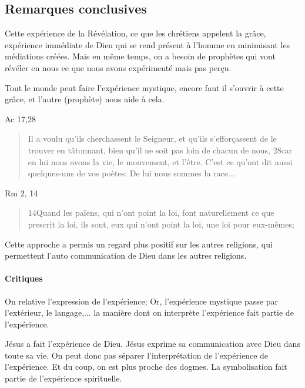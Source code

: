 \subsection{Remarques conclusives }

\begin{Synthesis}
Cette expérience de la Révélation, ce que les chrétiens appelent la grâce, expérience immédiate de Dieu qui se rend présent à l'homme en minimisant les médiations créées.
Mais en même temps, on a besoin de prophètes qui vont révéler en nous ce que nous avons expérimenté mais pas perçu.
\end{Synthesis} 

Tout le monde peut faire l'expérience mystique, encore faut il s'ouvrir à cette grâce, et l'autre (prophète) nous aide à cela.

Ac 17,28
\begin{quote}
    Il a voulu qu'ils cherchassent le Seigneur, et qu'ils s'efforçassent de le trouver en tâtonnant, bien qu'il ne soit pas loin de chacun de nous, 28car en lui nous avons la vie, le mouvement, et l'être. C'est ce qu'ont dit aussi quelques-uns de vos poètes: De lui nous sommes la race... 
\end{quote}


Rm 2, 14

\begin{quote}
    14Quand les païens, qui n'ont point la loi, font naturellement ce que prescrit la loi, ils sont, eux qui n'ont point la loi, une loi pour eux-mêmes;
\end{quote}

Cette approche a permis un regard plus positif sur les autres religions, qui permettent l'auto communication de Dieu dans les autres religions. 

\paragraph{Critiques} On relative l'expression de l'expérience; Or, l'expérience mystique passe par l'extérieur, le langage,... la manière dont on interprète l'expérience fait partie de l'expérience.

\begin{Ex}
Jésus a fait l'expérience de Dieu. Jésus exprime sa communication avec Dieu dans toute sa vie.
On peut donc pas séparer l'interprétation de l'expérience de l'expérience.
Et du coup, on est plus proche des dogmes. La symbolisation fait partie de l'expérience spirituelle. 
\end{Ex}

